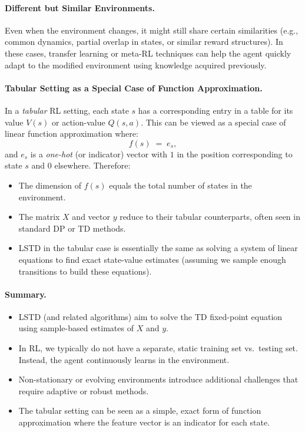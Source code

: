 \paragraph{Different but Similar Environments.}
Even when the environment changes, it might still share certain similarities (e.g., common dynamics, partial overlap in states, or similar reward structures). In these cases, transfer learning or meta-RL techniques can help the agent quickly adapt to the modified environment using knowledge acquired previously.

\paragraph{Tabular Setting as a Special Case of Function Approximation.}
In a \emph{tabular} RL setting, each state $s$ has a corresponding entry in a table for its value $V(s)$ or action-value $Q(s,a)$. This can be viewed as a special case of linear function approximation where:
\[
f(s) \;=\; e_s,
\]
and $e_s$ is a \emph{one-hot} (or indicator) vector with $1$ in the position corresponding to state $s$ and $0$ elsewhere. Therefore:
\begin{itemize}
    \item The dimension of $f(s)$ equals the total number of states in the environment.
    \item The matrix $X$ and vector $y$ reduce to their tabular counterparts, often seen in standard DP or TD methods.
    \item LSTD in the tabular case is essentially the same as solving a system of linear equations to find exact state-value estimates (assuming we sample enough transitions to build these equations).
\end{itemize}

\paragraph{Summary.}
\begin{itemize}
    \item LSTD (and related algorithms) aim to solve the TD fixed-point equation using sample-based estimates of $X$ and $y$.
    \item In RL, we typically do not have a separate, static training set vs.\ testing set. Instead, the agent continuously learns in the environment.
    \item Non-stationary or evolving environments introduce additional challenges that require adaptive or robust methods.
    \item The tabular setting can be seen as a simple, exact form of function approximation where the feature vector is an indicator for each state.
\end{itemize}


